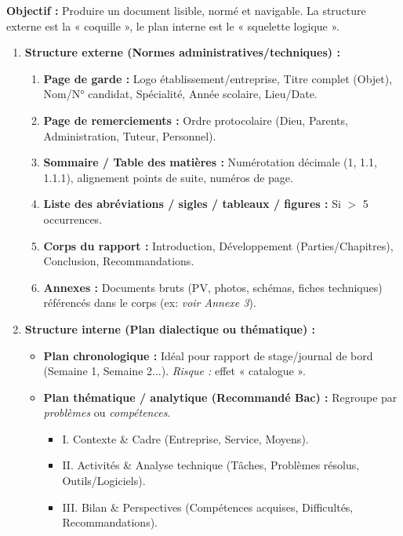 \documentclass[11pt]{article}
\begin{document}
\begin{methode}
    \textbf{Objectif :} Produire un document lisible, normé et navigable. La structure externe est la « coquille », le plan interne est le « squelette logique ».
    \begin{enumerate}
        \item \textbf{Structure externe (Normes administratives/techniques) :}
            \begin{enumerate}
                \item \textbf{Page de garde :} Logo établissement/entreprise, Titre complet (Objet), Nom/N° candidat, Spécialité, Année scolaire, Lieu/Date.
                \item \textbf{Page de remerciements :} Ordre protocolaire (Dieu, Parents, Administration, Tuteur, Personnel).
                \item \textbf{Sommaire / Table des matières :} Numérotation décimale (1, 1.1, 1.1.1), alignement points de suite, numéros de page.
                \item \textbf{Liste des abréviations / sigles / tableaux / figures :} Si $>$ 5 occurrences.
                \item \textbf{Corps du rapport :} Introduction, Développement (Parties/Chapitres), Conclusion, Recommandations.
                \item \textbf{Annexes :} Documents bruts (PV, photos, schémas, fiches techniques) référencés dans le corps (ex: \emph{voir Annexe 3}).
            \end{enumerate}
        \item \textbf{Structure interne (Plan dialectique ou thématique) :}
            \begin{itemize}
                \item \textbf{Plan chronologique :} Idéal pour rapport de stage/journal de bord (Semaine 1, Semaine 2...). \emph{Risque :} effet « catalogue ».
                \item \textbf{Plan thématique / analytique (Recommandé Bac) :} Regroupe par \emph{problèmes} ou \emph{compétences}.
                    \begin{itemize}
                        \item I. Contexte \& Cadre (Entreprise, Service, Moyens).
                        \item II. Activités \& Analyse technique (Tâches, Problèmes résolus, Outils/Logiciels).
                        \item III. Bilan \& Perspectives (Compétences acquises, Difficultés, Recommandations).

\end{itemize}
\end{itemize}
\end{enumerate}
\end{methode}
\end{document}
